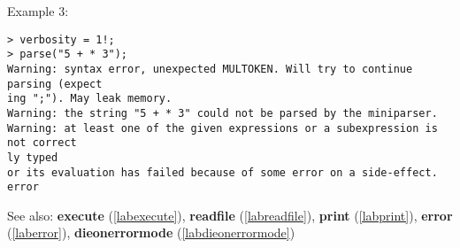 \noindent Example 3: 
\begin{center}\begin{minipage}{15cm}\begin{Verbatim}[frame=single]
> verbosity = 1!;
> parse("5 + * 3");
Warning: syntax error, unexpected MULTOKEN. Will try to continue parsing (expect
ing ";"). May leak memory.
Warning: the string "5 + * 3" could not be parsed by the miniparser.
Warning: at least one of the given expressions or a subexpression is not correct
ly typed
or its evaluation has failed because of some error on a side-effect.
error
\end{Verbatim}
\end{minipage}\end{center}
See also: \textbf{execute} (\ref{labexecute}), \textbf{readfile} (\ref{labreadfile}), \textbf{print} (\ref{labprint}), \textbf{error} (\ref{laberror}), \textbf{dieonerrormode} (\ref{labdieonerrormode})
